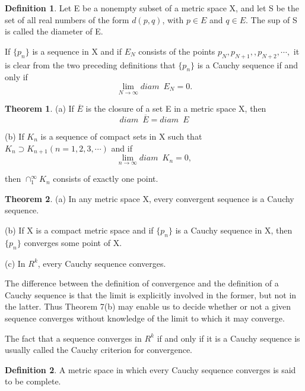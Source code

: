 \documentclass{article}
\theoremstyle{definition}
\newtheorem{defi}{Definition}
\newtheorem{theo}{Theorem}
\theoremstyle{remark}
\begin{document}
\begin{defi}
	Let E be a nonempty subset of a metric space X, and let S be the set of all real numbers of the form $d(p,q)$, with $p\in E$ and $q\in E$. The sup of S is called the diameter of E.
\end{defi}

If $\{p_n\}$ is a sequence in X and if $E_N$ consists of the points $p_N,p_{N+1},,p_{N+2},\cdots,$ it is clear from the two preceding definitions that $\{p_n\}$ is a Cauchy sequence if and only if
	\[
	\lim_{N\rightarrow\infty} diam\enspace E_N=0.
	\]

\begin{theo}
\hspace{\fill}

	(a) If $\overline{E}$ is the closure of a set E in a metric space X, then 
	\[
	diam\enspace \overline{E}=diam\enspace E
	\]
	
	(b) If $K_n$ is a sequence of compact sets in X such that $K_n\supset K_{n+1}(n=1,2,3,\cdots)$ and if 
	\[
	\lim_{n\rightarrow\infty} diam\enspace K_n=0,
	\]
	
	then $\cap^\infty_1 K_n$ consists of exactly one point.
	 
\end{theo}

\begin{theo}
\hspace{\fill}

	(a) In any metric space X, every convergent sequence is a Cauchy sequence.
	
	(b) If X is a compact metric space and if $\{p_n\}$ is a Cauchy sequence in X, then $\{p_n\}$ converges some point of X.
	
	(c) In $R^k$, every Cauchy sequence converges.
\end{theo}

The difference between the definition of convergence and the definition of a Cauchy sequence is that the limit is explicitly involved in the former, but not in the latter. Thus Theorem 7(b) may enable us to decide whether or not a given sequence converges without knowledge of the limit to which it may converge.

The fact that a sequence converges in $R^k$ if and only if it is a Cauchy sequence is usually called the Cauchy criterion for convergence.

\begin{defi}
 A metric space in which every Cauchy sequence converges is said to be complete.	
\end{defi}
\end{document}
